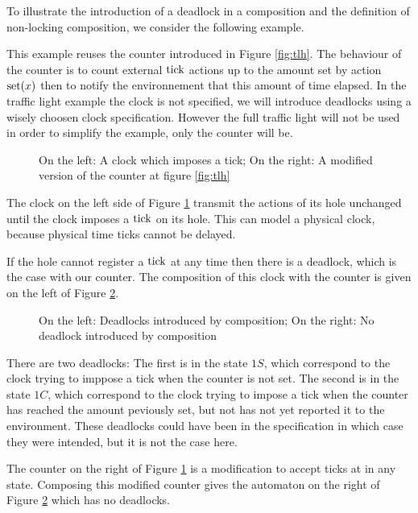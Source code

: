 \documentclass{article}
\begin{document}
To illustrate the introduction of a deadlock in a composition and the definition of non-locking composition, we consider the following example.
\begin{exi}
This example reuses the counter introduced in Figure \ref{fig:tlh}.
The behaviour of the counter is to count external \(\mathrm{tick}\) actions up to the amount set by action \(\mathrm{set}{\left(x\right)}\) then to notify the environnement that this amount of time elapsed.
In the traffic light example the clock is not specified, we will introduce deadlocks using a wisely choosen clock specification.
However the full traffic light will not be used in order to simplify the example, only the counter will be.

\begin{figure}

\vrule

\caption{On the left: A clock which imposes a tick; On the right: A modified version of the counter at figure \ref{fig:tlh}}
\label{fig:anytick}
\end{figure}
The clock on the left side of Figure \ref{fig:anytick} transmit the actions of its hole unchanged until the clock imposes a \(\mathrm{tick}\) on its hole.
This can model a physical clock, because physical time ticks cannot be delayed.

If the hole cannot register a \(\mathrm{tick}\) at any time then there is a deadlock, which is the case with our counter.
The composition of this clock with the counter is given on the left of Figure \ref{fig:deadlock}.
\begin{figure}

\vrule

\caption{On the left: Deadlocks introduced by composition; On the right: No deadlock introduced by composition}
\label{fig:deadlock}
\end{figure}
There are two deadlocks:
The first is in the state \(1S\), which correspond to the clock trying to imppose a tick when the counter is not set.
The second is in the state \(1C\), which correspond to the clock trying to impose a tick when the counter has reached the amount peviously set, but not has not yet reported it to the environment.
These deadlocks could have been in the specification in which case they were intended, but it is not the case here.

The counter on the right of Figure \ref{fig:anytick} is a modification to accept ticks at in any state.
Composing this modified counter gives the automaton on the right of Figure \ref{fig:deadlock} which has no deadlocks.


\end{exi}
\end{document}
